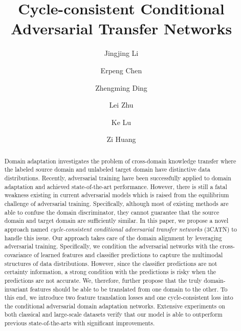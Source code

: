 \documentclass[sigconf]{acmart}
\begin{document}
\fancyhead{}
\title{Cycle-consistent Conditional Adversarial Transfer Networks}















\author{Jingjing Li}

\author{Erpeng Chen}

\author{Zhengming Ding}

\author{Lei Zhu}

\author{Ke Lu}

\author{Zi Huang}
\renewcommand{\shortauthors}{Jingjing Li et al.}
\renewcommand{\shorttitle}{Cycle-consistent Conditional Adversarial Transfer Networks}

\begin{abstract}
Domain adaptation investigates the problem of cross-domain knowledge transfer where the labeled source domain and unlabeled target domain have distinctive data distributions. Recently, adversarial training have been successfully applied to domain adaptation and achieved state-of-the-art performance. However, there is still a fatal weakness existing in current adversarial models which is raised from the equilibrium challenge of adversarial training. Specifically, although most of existing methods are able to confuse the domain discriminator, they cannot guarantee that the source domain and target domain are sufficiently similar. In this paper, we propose a novel approach named {\it cycle-consistent conditional adversarial transfer networks} (3CATN) to handle this issue. Our approach takes care of the domain alignment by leveraging adversarial training. Specifically, we condition the adversarial networks with the cross-covariance of learned features and classifier predictions to capture the multimodal structures of data distributions. However, since the classifier predictions are not certainty information, a strong condition with the predictions is risky when the predictions are not accurate. We, therefore, further propose that the truly domain-invariant features should be able to be translated from one domain to the other. To this end, we introduce two feature translation losses and one cycle-consistent loss into the conditional adversarial domain adaptation networks. Extensive experiments on both classical and large-scale datasets verify that our model is able to outperform previous state-of-the-arts with significant improvements.
\end{abstract}
\end{document}
